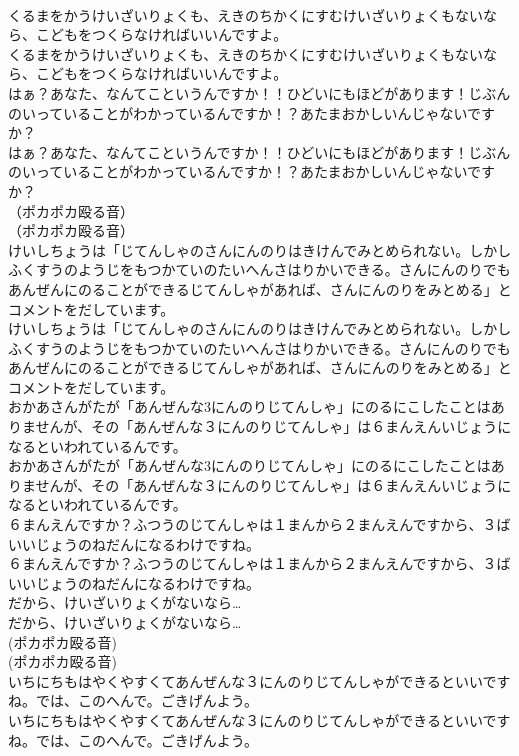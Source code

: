 \documentclass[8pt]{extreport}
\begin{document}
\begin{CJK}{UTF8}{min}
\\	くるまをかうけいざいりょくも、えきのちかくにすむけいざいりょくもないなら、こどもをつくらなければいいんですよ。	
\\	くるまをかうけいざいりょくも、えきのちかくにすむけいざいりょくもないなら、こどもをつくらなければいいんですよ。 
\\	はぁ？あなた、なんてこというんですか！！ひどいにもほどがあります！じぶんのいっていることがわかっているんですか！？あたまおかしいんじゃないですか？	
\\	はぁ？あなた、なんてこというんですか！！ひどいにもほどがあります！じぶんのいっていることがわかっているんですか！？あたまおかしいんじゃないですか？ 
\\	（ポカポカ殴る音）	
\\	（ポカポカ殴る音） 
\\	けいしちょうは「じてんしゃのさんにんのりはきけんでみとめられない。しかしふくすうのようじをもつかていのたいへんさはりかいできる。さんにんのりでもあんぜんにのることができるじてんしゃがあれば、さんにんのりをみとめる」とコメントをだしています。	
\\	けいしちょうは「じてんしゃのさんにんのりはきけんでみとめられない。しかしふくすうのようじをもつかていのたいへんさはりかいできる。さんにんのりでもあんぜんにのることができるじてんしゃがあれば、さんにんのりをみとめる」とコメントをだしています。 
\\	おかあさんがたが「あんぜんな3にんのりじてんしゃ」にのるにこしたことはありませんが、その「あんぜんな３にんのりじてんしゃ」は６まんえんいじょうになるといわれているんです。	
\\	おかあさんがたが「あんぜんな3にんのりじてんしゃ」にのるにこしたことはありませんが、その「あんぜんな３にんのりじてんしゃ」は６まんえんいじょうになるといわれているんです。 
\\	６まんえんですか？ふつうのじてんしゃは１まんから２まんえんですから、３ばいいじょうのねだんになるわけですね。	
\\	６まんえんですか？ふつうのじてんしゃは１まんから２まんえんですから、３ばいいじょうのねだんになるわけですね。 
\\	だから、けいざいりょくがないなら…	
\\	だから、けいざいりょくがないなら… 
\\	(ポカポカ殴る音)	
\\	(ポカポカ殴る音) 
\\	いちにちもはやくやすくてあんぜんな３にんのりじてんしゃができるといいですね。では、このへんで。ごきげんよう。	
\\	いちにちもはやくやすくてあんぜんな３にんのりじてんしゃができるといいですね。では、このへんで。ごきげんよう。 

\end{CJK}
\end{document}
